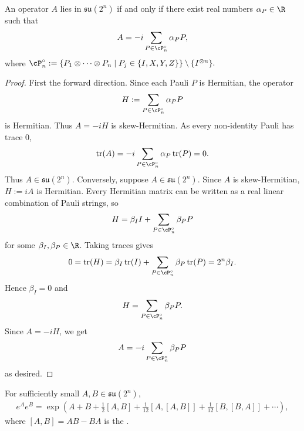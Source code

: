 \begin{fact}
\label{fact:pauli-basis-su}
An operator $A$ lies in $\mathfrak{su}(2^n)$ if and only if there exist real numbers $\alpha_P \in \R$ such that
\begin{align}
    A
    =
    -i
    \sum_{P \in \cP_n^\circ}
    \alpha_P P,
\end{align}
where
$
    \cP_n^\circ
    :=
    \{ P_1 \otimes \cdots \otimes P_n
    \mid
    P_j \in \{I,X,Y,Z\}
    \}
    \setminus \{I^{\otimes n}\}.
$
\end{fact}

\begin{proof}
First the forward direction. Since each Pauli $P$ is Hermitian, the operator
\begin{align}
    H
    :=
    \sum_{P \in \cP_n^\circ}
    \alpha_P P
\end{align}
is Hermitian. Thus $A=-iH$ is skew-Hermitian. As every non-identity Pauli has trace $0$,
\begin{align}
    \tr(A)
    =
    -i
    \sum_{P \in \cP_n^\circ}
    \alpha_P \tr(P)
    =
    0.
\end{align}
Thus $A \in \mathfrak{su}(2^n)$. Conversely, suppose $A \in \mathfrak{su}(2^n)$. Since $A$ is skew-Hermitian, $H:=iA$ is Hermitian. Every Hermitian matrix can be written as a real linear combination of Pauli strings, so
\begin{align}
    H
    =
    \beta_I I
    +
    \sum_{P \in \cP_n^\circ}
    \beta_P P
\end{align}
for some $\beta_I,\beta_P \in \R$. Taking traces gives
\begin{align}
    0
    =
    \tr(H)
    =
    \beta_I \tr(I)
    +
    \sum_{P \in \cP_n^\circ}
    \beta_P \tr(P)
    =
    2^n \beta_I.
\end{align}
Hence $\beta_I=0$ and
\begin{align}
    H
    =
    \sum_{P \in \cP_n^\circ}
    \beta_P P.
\end{align}
Since $A=-iH$, we get
\begin{align}
    A
    =
    -i
    \sum_{P \in \cP_n^\circ}
    \beta_P P
\end{align}
as desired.
\end{proof}

\begin{theorem}
\label{thm:bch}
For sufficiently small $A,B \in \mathfrak{su}(2^n)$,
\begin{align}
    e^A e^B
    =
    \exp\left(
    A+B+\frac{1}{2}[A,B]
    +\frac{1}{12}[A,[A,B]]
    +\frac{1}{12}[B,[B,A]]
    +\cdots
    \right),
\end{align}
where $[A,B]=AB-BA$ is the  \cite{Hall2015LieGroups}.
\end{theorem}

